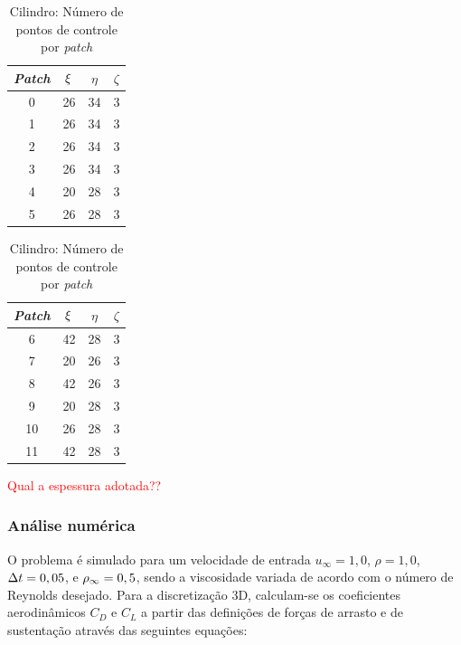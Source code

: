 \documentclass[tese_patricia]{subfiles}
\begin{document}
\begin{table}[h]
	\caption{Cilindro: Número de pontos de controle por \textit{patch}}
	\centering
	\begin{minipage}{0.49\textwidth}
		\centering
		\begin{tabular}{|c | c | c| c|} 
		\hline
		\textit{Patch} & $\xi$ & $\eta$ & $\zeta$\\ 
		\hline
		0 & 26 & 34 & 3\\
		\hline
		1 & 26 & 34 & 3\\
		\hline
		2 & 26 & 34 & 3\\
		\hline
		3 & 26 & 34 & 3\\
		\hline
		4 & 20 & 28 & 3\\
		\hline
		5 & 26 & 28 & 3\\ 
		\hline
		\end{tabular}
	\end{minipage}%
	\hspace{-3cm}  %
	\begin{minipage}{0.49\textwidth}
		\centering
		\begin{tabular}{|c | c | c| c|} 
		\hline
		\textit{Patch} & $\xi$ & $\eta$ & $\zeta$\\ 
		\hline
		6 & 42 & 28 & 3\\
		\hline
		7 & 20 & 26 & 3\\
		\hline
		8 & 42 & 26 & 3\\
		\hline
		9 & 20 & 28 & 3\\
		\hline
		10 & 26 & 28 & 3\\
		\hline
		11 & 42 & 28 & 3\\ 
		\hline
		\end{tabular}
		\label{tab:cilindro_discretização_patches}
	\end{minipage}
\end{table}

\textcolor{red}{Qual a espessura adotada??}

\subsubsection {Análise numérica}
O problema é simulado para um velocidade de entrada $u_{\infty} = 1,0$, $\rho = 1,0$, $\Delta t = 0,05$, e $\rho_\infty = 0,5$, sendo a viscosidade variada de acordo com o número de Reynolds desejado.  Para a discretização 3D, calculam-se os coeficientes aerodinâmicos $C_{D}$ e $C_{L}$ a partir das definições de forças de arrasto e de sustentação através das seguintes equações:
\end{document}
